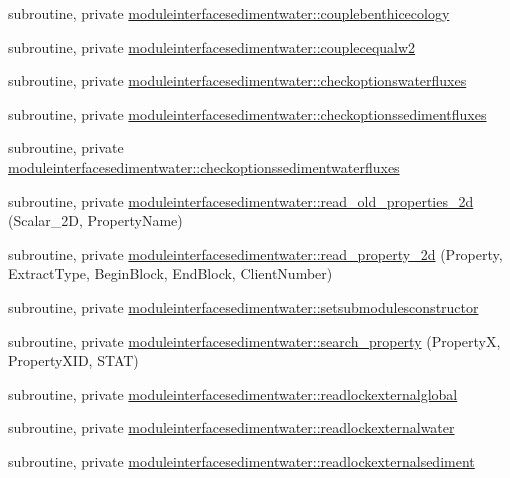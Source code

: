 \begin{DoxyCompactItemize}
\item 
subroutine, private \mbox{\hyperlink{namespacemoduleinterfacesedimentwater_a3f246d5d6de3e05347807acd5b8422a1}{moduleinterfacesedimentwater\+::couplebenthicecology}}
\item 
subroutine, private \mbox{\hyperlink{namespacemoduleinterfacesedimentwater_a853cbc670535f28311263abc42873874}{moduleinterfacesedimentwater\+::couplecequalw2}}
\item 
subroutine, private \mbox{\hyperlink{namespacemoduleinterfacesedimentwater_a3d7dba6457e9607bdd56867fc1e7516c}{moduleinterfacesedimentwater\+::checkoptionswaterfluxes}}
\item 
subroutine, private \mbox{\hyperlink{namespacemoduleinterfacesedimentwater_af1236045d4bf3e91947d80c8c3140745}{moduleinterfacesedimentwater\+::checkoptionssedimentfluxes}}
\item 
subroutine, private \mbox{\hyperlink{namespacemoduleinterfacesedimentwater_a4e30b1a0b5e1d1437a7a7f27bc7aea53}{moduleinterfacesedimentwater\+::checkoptionssedimentwaterfluxes}}
\item 
subroutine, private \mbox{\hyperlink{namespacemoduleinterfacesedimentwater_ae36783dede749530b40ad98b22316f39}{moduleinterfacesedimentwater\+::read\+\_\+old\+\_\+properties\+\_\+2d}} (Scalar\+\_\+2D, Property\+Name)
\item 
subroutine, private \mbox{\hyperlink{namespacemoduleinterfacesedimentwater_a8cfac9807ceccbcd4aa2d115757fe179}{moduleinterfacesedimentwater\+::read\+\_\+property\+\_\+2d}} (Property, Extract\+Type, Begin\+Block, End\+Block, Client\+Number)
\item 
subroutine, private \mbox{\hyperlink{namespacemoduleinterfacesedimentwater_a5922862ceb22f053a7ddf81b53a0be8c}{moduleinterfacesedimentwater\+::setsubmodulesconstructor}}
\item 
subroutine, private \mbox{\hyperlink{namespacemoduleinterfacesedimentwater_ae241bc3d883ac6be0459ecc4b5128d68}{moduleinterfacesedimentwater\+::search\+\_\+property}} (PropertyX, Property\+X\+ID, S\+T\+AT)
\item 
subroutine, private \mbox{\hyperlink{namespacemoduleinterfacesedimentwater_a4e44b21fdb18ed4d0fbeb1a77a327fff}{moduleinterfacesedimentwater\+::readlockexternalglobal}}
\item 
subroutine, private \mbox{\hyperlink{namespacemoduleinterfacesedimentwater_abd721cef18474ae3e82464d38e46a5e1}{moduleinterfacesedimentwater\+::readlockexternalwater}}
\item 
subroutine, private \mbox{\hyperlink{namespacemoduleinterfacesedimentwater_a0c18da6cbbd1ae812489854544d199b6}{moduleinterfacesedimentwater\+::readlockexternalsediment}}

\end{DoxyCompactItemize}
